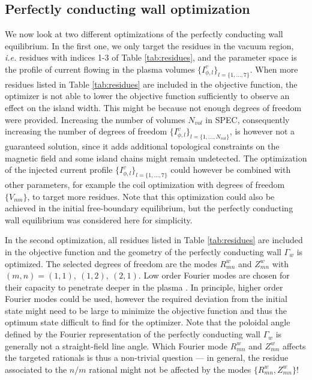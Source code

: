 \subsection{Perfectly conducting wall optimization}

 We now look at two different optimizations of the perfectly conducting wall equilibrium. In the first one, we only target the residues in the vacuum region, \textit{i.e.} residues with indices 1-3 of Table \ref{tab:residues}, and the parameter space is the profile of current flowing in the plasma volumes $\{I^v_{\phi,l}\}_{l=\{1,\ldots,7\}}$. When more residues listed in Table \ref{tab:residues} are included in the objective function, the optimizer is not able to lower the objective function sufficiently to observe an effect on the island width. This might be because not enough degrees of freedom were provided. Increasing the number of volumes $N_{vol}$ in \ac{SPEC}, consequently increasing the number of degrees of freedom $\{I^v_{\phi,l}\}_{l=\{1,\ldots,N_{vol}\}}$, is however not a guaranteed solution, since it adds additional topological constraints on the magnetic field and some island chains might remain undetected. The optimization of the injected current profile $\{I^v_{\phi,l}\}_{l=\{1,\ldots,7\}}$ could however be combined with other parameters, for example the coil optimization with degrees of freedom $\{V_{mn}\}$, to target more residues. Note that this optimization could also be achieved in the initial free-boundary equilibrium, but the perfectly conducting wall equilibrium was considered here for simplicity.
 
 In the second optimization, all residues listed in Table \ref{tab:residues} are included in the objective function and the geometry of the perfectly conducting wall $\Gamma_w$ is optimized. The selected degrees of freedom are the modes $R^w_{mn}$ and $Z^w_{mn}$ with $(m,n)=(1,1),\ (1,2),\ (2,1)$. Low order Fourier modes are chosen for their capacity to penetrate deeper in the plasma \citep{Helander2014}. In principle, higher order Fourier modes could be used, however the required deviation from the initial state might need to be large to minimize the objective function and thus the optimum state difficult to find for the optimizer. Note that the poloidal angle defined by the Fourier representation of the perfectly conducting wall $\Gamma_w$ is generally not a straight-field line angle. Which Fourier mode $R^w_{mn}$ and $Z^w_{mn}$ affects the targeted rationals is thus a non-trivial question --- in general, the residue associated to the $n/m$ rational might not be affected by the modes $\{R^w_{mn},Z^w_{mn}\}$!


